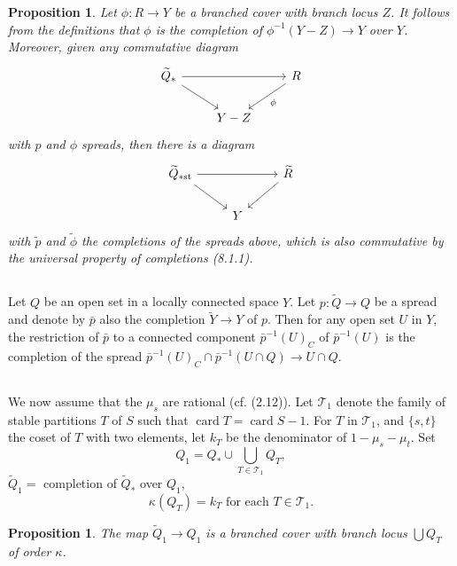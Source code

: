 \documentclass[12pt,a4paper]{article}
\theoremstyle{plain}
\newtheorem{proposition}[theorem]{Proposition}
\theoremstyle{definition}
\theoremstyle{remark}
\DeclareMathOperator{\card}{card}
\begin{document}
\begin{proposition}
\label{9.7.1}
Let $\phi : R \to Y$ be a branched cover with branch locus $Z$. It follows from the definitions that $\phi$ is the completion of $\phi^{-1}(Y - Z) \to Y$ over $Y$. Moreover, given any commutative diagram
\[
\begin{tikzcd}
\widetilde{Q}_* \arrow[dr] \arrow[rr] & & R \arrow[dl, "\phi"] \\
& Y - Z &
\end{tikzcd}
\]
with $p$ and $\phi$ spreads, then there is a diagram
\[
\begin{tikzcd}
\widetilde{Q}_{*\text{st}} \arrow[dr] \arrow[rr] & & \widetilde{R} \arrow[dl] \\
& Y &
\end{tikzcd}
\]
with $\widetilde{p}$ and $\widetilde{\phi}$ the completions of the spreads above, which is also commutative by the universal property of completions (8.1.1).
\end{proposition}

\subsection{}
\label{9.8}

Let $Q$ be an open set in a locally connected space $Y$. Let $p : \widetilde{Q} \to Q$ be a spread and denote by $\bar{p}$ also the completion $\widetilde{Y} \to Y$ of $p$. Then for any open set $U$ in $Y$, the restriction of $\bar{p}$ to a connected component $\bar{p}^{-1}(U)_C$ of $\bar{p}^{-1}(U)$ is the completion of the spread $\bar{p}^{-1}(U)_C \cap \bar{p}^{-1}(U \cap Q) \to U \cap Q$.

\subsection{}
\label{9.9}

We now assume that the $\mu_s$ are rational (cf. (2.12)). Let $\mathscr{T}_1$ denote the family of stable partitions $T$ of $S$ such that $\card T = \card S - 1$. For $T$ in $\mathscr{T}_1$, and $\{s, t\}$ the coset of $T$ with two elements, let $k_T$ be the denominator of $1 - \mu_s - \mu_t$. Set
\[
Q_1 = Q_* \cup \bigcup_{T \in \mathscr{T}_1} Q_T,
\]
$\widetilde{Q}_1 =$ completion of $\widetilde{Q}_*$ over $Q_1$,
\[
\kappa(Q_T) = k_T \text{ for each } T \in \mathscr{T}_1.
\]

\begin{proposition}
\label{9.10}
The map $\widetilde{Q}_1 \to Q_1$ is a branched cover with branch locus $\bigcup Q_T$ of order $\kappa$.
\end{proposition}
\end{document}
